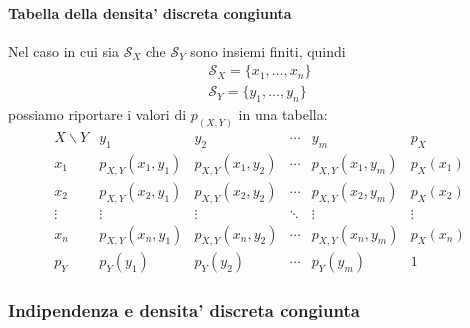 \documentclass[a4paper,12pt]{article}
\begin{document}
\paragraph{Tabella della densita' discreta congiunta} Nel caso in cui sia $\mathcal{S}_X$ che $\mathcal{S}_Y$ sono insiemi finiti, quindi
\begin{align*}
  \mathcal{S}_X = \{x_1, \dots, x_n\}\\
  \mathcal{S}_Y = \{y_1, \dots, y_n\}
\end{align*}
possiamo riportare i valori di $p_{(X,Y)}$ in una tabella:
\[
\begin{array}{c|cccc|c}
X \backslash Y 
  & y_1 
  & y_2 
  & \cdots 
  & y_m 
  & p_X \\ \hline
x_1 
  & p_{X,Y}(x_1,y_1) 
  & p_{X,Y}(x_1,y_2) 
  & \cdots 
  & p_{X,Y}(x_1,y_m) 
  & p_X(x_1) \\
x_2 
  & p_{X,Y}(x_2,y_1) 
  & p_{X,Y}(x_2,y_2) 
  & \cdots 
  & p_{X,Y}(x_2,y_m) 
  & p_X(x_2) \\
\vdots 
  & \vdots 
  & \vdots 
  & \ddots 
  & \vdots 
  & \vdots \\
x_n 
  & p_{X,Y}(x_n,y_1) 
  & p_{X,Y}(x_n,y_2) 
  & \cdots 
  & p_{X,Y}(x_n,y_m) 
  & p_X(x_n) \\ \hline
p_Y 
  & p_Y(y_1) 
  & p_Y(y_2) 
  & \cdots 
  & p_Y(y_m) 
  & 1
\end{array}
\]
\subsubsection{Indipendenza e densita' discreta congiunta}
\\
\vspace{1px}\\
\end{document}
